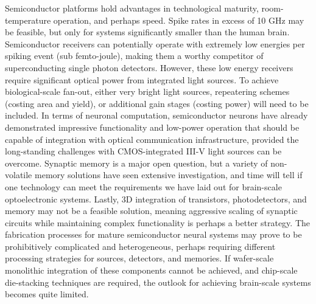 \documentclass[twocolumn]{article}
\begin{document}
Semiconductor platforms hold advantages in technological maturity, room-temperature operation, and perhaps speed. Spike rates in excess of 10 GHz may be feasible, but only for systems significantly smaller than the human brain. Semiconductor receivers can potentially operate with extremely low energies per spiking event (sub femto-joule), making them a worthy competitor of superconducting single photon detectors. However, these low energy receivers require significant optical power from integrated light sources. To achieve biological-scale fan-out, either very bright light sources, repeatering schemes (costing area and yield), or additional gain stages (costing power) will need to be included. In terms of neuronal computation, semiconductor neurons have already demonstrated impressive functionality and low-power operation that should be capable of integration with optical communication infrastructure, provided the long-standing challenges with CMOS-integrated III-V light sources can be overcome. Synaptic memory is a major open question, but a variety of non-volatile memory solutions have seen extensive investigation, and time will tell if one technology can meet the requirements we have laid out for brain-scale optoelectronic systems. Lastly, 3D integration of transistors, photodetectors, and memory may not be a feasible solution, meaning aggressive scaling of synaptic circuits while maintaining complex functionality is perhaps a better strategy. The fabrication processes for mature semiconductor neural systems may prove to be prohibitively complicated and heterogeneous, perhaps requiring different processing strategies for sources, detectors, and memories. If wafer-scale monolithic integration of these components cannot be achieved, and chip-scale die-stacking techniques are required, the outlook for achieving brain-scale systems becomes quite limited.
\end{document}
